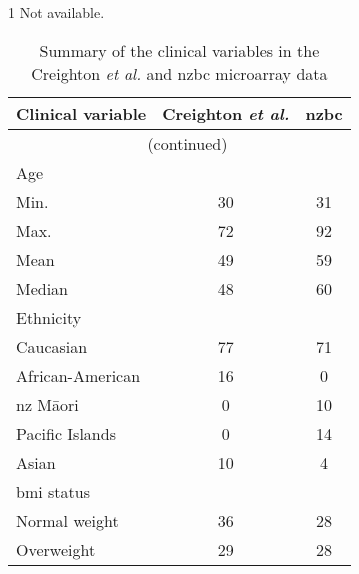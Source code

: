 \begin{ThreePartTable}
		\centering
	\begin{TableNotes}
		\begin{footnotesize}
			\item [1] Not available.
		\end{footnotesize}
	\end{TableNotes}
	
	\newpage
	\begin{longtable}{lcc}
		\caption{Summary of the clinical variables in the Creighton \textit{et al.} and \gls{nzbc} microarray data}
		\label{tab:clin_summary}\\
		Clinical variable & Creighton \textit{et al.} & \gls{nzbc} \\
		\endfirsthead
		\multicolumn{3}{c}{\tablename\ \thetable{}\ (continued)}\\
		\endhead
		\hline
		\hline
		\rule{0pt}{2.25ex}Age \\
		\hspace{1em} Min.                    & 30 & 31 \\
		\hspace{1em} Max.                    & 72 & 92 \\
		\hspace{1em} Mean                    & 49 & 59 \\
		\hspace{1em} Median                  & 48 & 60 \\
		\hline
		\rule{0pt}{2.25ex}Ethnicity         \\
		\hspace{1em} Caucasian               & 77 & 71 \\
		\hspace{1em} African-American        & 16 & 0  \\
		\hspace{1em} \gls{nz} M\=aori        & 0  & 10 \\
		\hspace{1em} Pacific Islands         & 0  & 14 \\
		\hspace{1em} Asian                   & 10 & 4  \\
		\hline
		\rule{0pt}{2.25ex}\gls{bmi} status  \\
		\hspace{1em} Normal weight           & 36 & 28 \\
		\hspace{1em} Overweight              & 29 & 28 \\

\end{longtable}
\end{ThreePartTable}
